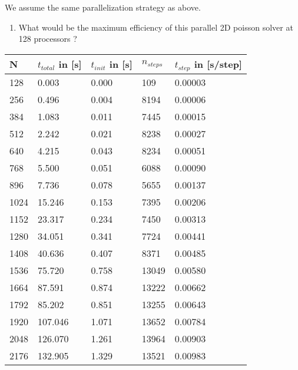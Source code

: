 \documentclass[11pt,a4paper]{article}
\begin{document}
\begin{exercise}
$~$ %

We assume the same parallelization strategy as above.

\begin{enumerate}[label=(\alph*)]
	\item What would be the maximum efficiency of this parallel 2D poisson solver at 128 processors ?

\end{enumerate}
  

\end{exercise}


\begin{table}[!ht]
\centering
\begin{tabular}{ | l | l | l | l | l |} 
\hline 
\textbf{N} & \textbf{$t_{total}$} in [s] & \textbf{$t_{init}$} in [s] & \textbf{$n_{steps}$} & \textbf{$t_{step}$} in [s/step] \\ 
\hline 
 128 & 0.003 & 0.000 & 109 & 0.00003 \\ 
\hline 
 256 & 0.496 & 0.004 & 8194 & 0.00006 \\ 
\hline 
 384 & 1.083 & 0.011 & 7445 & 0.00015 \\ 
\hline 
 512 & 2.242 & 0.021 & 8238 & 0.00027 \\ 
\hline 
 640 & 4.215 & 0.043 & 8234 & 0.00051 \\ 
\hline 
 768 & 5.500 & 0.051 & 6088 & 0.00090 \\ 
\hline 
 896 & 7.736 & 0.078 & 5655 & 0.00137 \\ 
\hline 
 1024 & 15.246 & 0.153 & 7395 & 0.00206 \\ 
\hline 
 1152 & 23.317 & 0.234 & 7450 & 0.00313 \\ 
\hline 
 1280 & 34.051 & 0.341 & 7724 & 0.00441 \\ 
\hline 
 1408 & 40.636 & 0.407 & 8371 & 0.00485 \\ 
\hline 
 1536 & 75.720 & 0.758 & 13049 & 0.00580 \\ 
\hline 
 1664 & 87.591 & 0.874 & 13222 & 0.00662 \\ 
\hline 
 1792 & 85.202 & 0.851 & 13255 & 0.00643 \\ 
\hline 
 1920 & 107.046 & 1.071 & 13652 & 0.00784 \\ 
\hline 
 2048 & 126.070 & 1.261 & 13964 & 0.00903 \\ 
\hline 
 2176 & 132.905 & 1.329 & 13521 & 0.00983 \\ 

\end{tabular}
\end{table}
\end{document}
